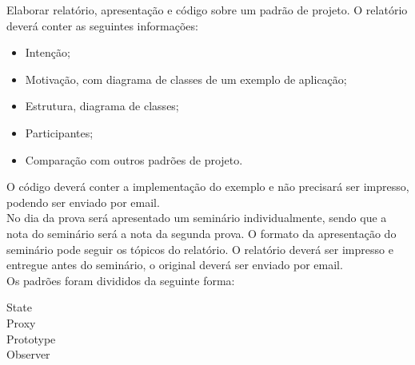 Elaborar relatório, apresentação e código sobre um padrão de projeto.
O relatório deverá conter as seguintes informações:
\begin{itemize}
\item Intenção;
\item Motivação, com diagrama de classes de um exemplo de aplicação;
\item Estrutura, diagrama de classes;
\item Participantes;
\item Comparação com outros padrões de projeto.
\end{itemize}

\noindent O código deverá conter a implementação do exemplo e não precisará ser
impresso, podendo ser enviado por email.\\

No dia da prova será apresentado um seminário individualmente, sendo que a nota
do seminário será a nota da segunda prova. O formato da apresentação do seminário
pode seguir os tópicos do relatório. O relatório deverá ser impresso e entregue
antes do seminário, o original deverá ser enviado por email.\\

Os padrões foram divididos da seguinte forma:

\begin{description}
\item[State] 
\item[Proxy] 
\item[Prototype] 
\item[Observer] 
\end{description}
